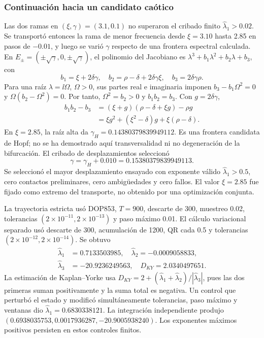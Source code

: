 \subsubsection{Continuación hacia un candidato caótico}
Las dos ramas en \((\xi,\gamma)=(3.1,0.1)\) no superaron el cribado
finito \(\widehat\lambda_1>0.02\). Se transportó entonces la rama de menor
frecuencia desde \(\xi=3.10\) hasta 2.85 en pasos de \(-0.01\), y luego
se varió \(\gamma\) respecto de una frontera espectral calculada.
En \(E_\pm=(\pm\sqrt\gamma,0,\pm\sqrt\gamma)\), el polinomio del
Jacobiano es \(\lambda^3+b_1\lambda^2+b_2\lambda+b_3\), con
\[
 b_1=\xi+2\delta\gamma,\quad
 b_2=\rho-\delta+2\delta\gamma\xi,\quad
 b_3=2\delta\gamma\rho.
\]
Para una raíz \(\lambda=\ii\Omega\), \(\Omega>0\), sus partes real e
imaginaria imponen \(b_3-b_1\Omega^2=0\) y
\(\Omega(b_2-\Omega^2)=0\). Por tanto,
\(\Omega^2=b_2>0\) y \(b_1b_2=b_3\). Con \(g=2\delta\gamma\),
\begin{equation}
 \begin{split}
 b_1b_2-b_3
 &=(\xi+g)(\rho-\delta+\xi g)-\rho g\\
 &=\xi g^2+(\xi^2-\delta)g+\xi(\rho-\delta).
 \end{split}
 \label{bre:res:mavpd-hopf}
\end{equation}
En \(\xi=2.85\), la raíz alta da
\(\gamma_H=0.14380379839949112\). Es una frontera candidata de Hopf;
no se ha demostrado aquí transversalidad ni no degeneración de la
bifurcación. El cribado de desplazamientos seleccionó
\[
 \gamma=\gamma_H+0.010=0.15380379839949113.
\]
Se seleccionó el mayor desplazamiento ensayado con exponente válido
\(\widehat\lambda_1>0.5\), cero contactos preliminares, cero ambigüedades y
cero fallos. El valor \(\xi=2.85\) fue fijado como extremo del transporte,
no obtenido por una optimización conjunta.

La trayectoria estricta usó DOP853, \(T=900\), descarte de 300, muestreo
0.02, tolerancias \((2\times10^{-11},2\times10^{-13})\) y paso máximo 0.01.
El cálculo variacional separado usó descarte de 300, acumulación de 1200,
QR cada 0.5 y tolerancias \((2\times10^{-12},2\times10^{-14})\). Se obtuvo
\[
 \begin{aligned}
 \widehat\lambda_1&=0.7133503985,\quad
 \widehat\lambda_2=-0.0009058833,\\
 \widehat\lambda_3&=-20.9236249563,\quad D_{KY}=2.0340497651.
 \end{aligned}
\]
La estimación de Kaplan--Yorke usa
\(D_{KY}=2+(\widehat\lambda_1+\widehat\lambda_2)/|\widehat\lambda_3|\),
pues las dos primeras suman positivamente y la suma total es negativa.
Un control que perturbó el estado y modificó simultáneamente tolerancias,
paso máximo y ventanas dio \(\widehat\lambda_1=0.6830338121\).
La integración independiente produjo
\((0.6938035753,0.0017936287,-20.9005938240)\).
Los exponentes máximos positivos persisten en estos controles finitos.

